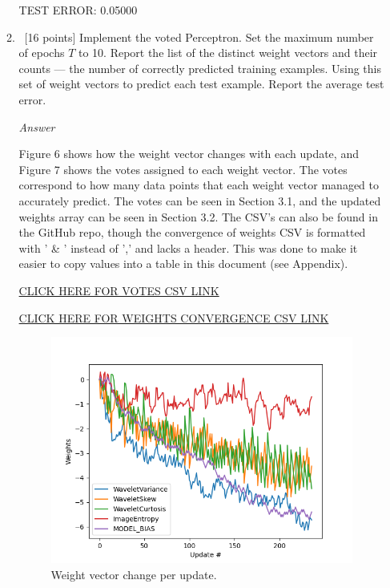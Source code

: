 \documentclass[12pt, fullpage,letterpaper]{article}
\begin{document}
\begin{enumerate}
\begin{enumerate}
    TEST ERROR:   0.05000
	
	\item~[16 points] Implement the voted Perceptron. Set the maximum number of epochs $T$ to 10. Report the list of the distinct weight vectors and their counts --- the number of correctly predicted training examples. Using this set of weight vectors to predict each test example. Report the average test error. 
	
	\emph{Answer}
	
	Figure 6 shows how the weight vector changes with each update, and Figure 7 shows the votes assigned to each weight vector. The votes correspond to how many data points that each weight vector managed to accurately predict. The votes can be seen in Section 3.1, and the updated weights array can be seen in Section 3.2. The CSV's can also be found in the GitHub repo, though the convergence of weights CSV is formatted with ' \& ' instead of ',' and lacks a header. This was done to make it easier to copy values into a table in this document (see Appendix).
	
	\href{https://github.com/Paul-Wissler/cs-6350-hw3/blob/main/Instructions/q2b_votes.csv}{CLICK HERE FOR VOTES CSV LINK}
	
	\href{https://github.com/Paul-Wissler/cs-6350-hw3/blob/main/Instructions/q2b_weights_convergence.csv}{CLICK HERE FOR WEIGHTS CONVERGENCE CSV LINK}
	
	\begin{figure}[htp]
        \centering
        \includegraphics[width=12cm]{q2b_weights_convergence.png}
        \caption{Weight vector change per update.}
        \label{fig:q2b_weights}
    \end{figure}
    

\end{enumerate}
\end{enumerate}
\end{document}
